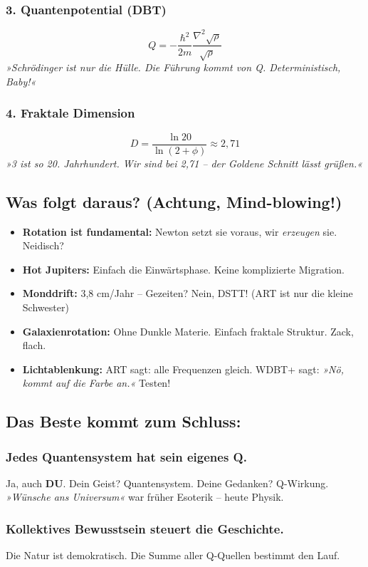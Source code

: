 \documentclass[10pt,a5paper]{article}
\begin{document}
\subsubsection*{3. Quantenpotential (DBT)}
\[
Q = -\frac{\hbar^2}{2m}\frac{\nabla^2\sqrt{\rho}}{\sqrt{\rho}}
\]
\textit{»Schrödinger ist nur die Hülle. Die Führung kommt von Q. Deterministisch, Baby!«}

\subsubsection*{4. Fraktale Dimension}
\[
D = \frac{\ln 20}{\ln(2+\phi)} \approx 2,71
\]
\textit{»3 ist so 20. Jahrhundert. Wir sind bei 2,71 – der Goldene Schnitt lässt grüßen.«}

\subsection*{Was folgt daraus? (Achtung, Mind-blowing!)}

\begin{itemize}
    \item \textbf{Rotation ist fundamental:} Newton setzt sie voraus, wir \textit{erzeugen} sie. Neidisch?
    \item \textbf{Hot Jupiters:} Einfach die Einwärtsphase. Keine komplizierte Migration.
    \item \textbf{Monddrift:} 3,8 cm/Jahr – Gezeiten? Nein, DSTT! (ART ist nur die kleine Schwester)
    \item \textbf{Galaxienrotation:} Ohne Dunkle Materie. Einfach fraktale Struktur. Zack, flach.
    \item \textbf{Lichtablenkung:} ART sagt: alle Frequenzen gleich. WDBT+ sagt: \textit{»Nö, kommt auf die Farbe an.«} Testen!
\end{itemize}

\subsection*{Das Beste kommt zum Schluss:}

\subsubsection*{Jedes Quantensystem hat sein eigenes Q.}
Ja, auch \textbf{DU}. Dein Geist? Quantensystem. Deine Gedanken? Q-Wirkung. 
\textit{»Wünsche ans Universum«} war früher Esoterik – heute Physik.

\subsubsection*{Kollektives Bewusstsein steuert die Geschichte.}
Die Natur ist demokratisch. Die Summe aller Q-Quellen bestimmt den Lauf.
\end{document}
